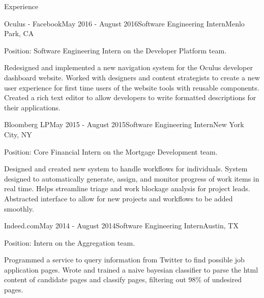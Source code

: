 \documentclass{resume} %
\begin{document}

\begin{rSection}{Experience}

  \begin{rSubsection}{Oculus - Facebook}{May 2016 - August 2016}{Software Engineering Intern}{Menlo Park, CA}
  \item Position: Software Engineering Intern on the Developer Platform team.
  \item Redesigned and implemented a new navigation system for the Oculus developer dashboard website. Worked with designers and content strategists to create a new user experience for first time users of the website tools with reusable components. Created a rich text editor to allow developers to write formatted descriptions for their applications. 
  \end{rSubsection}



  \begin{rSubsection}{Bloomberg LP}{May 2015 - August 2015}{Software Engineering Intern}{New York City, NY}
  \item Position: Core Financial Intern on the Mortgage Development team.
  \item Designed and created new system to handle workflows for individuals. System designed to automatically generate, assign, and monitor progress of work items in real time. Helps streamline triage and work blockage analysis for project leads. Abstracted interface to allow for new projects and workflows to be added smoothly. 
\end{rSubsection}


\begin{rSubsection}{Indeed.com}{May 2014 - August 2014}{Software Engineering Intern}{Austin, TX}
\item Position: Intern on the Aggregation team.
\item Programmed a service to query information from Twitter to find possible job application pages. Wrote and trained a naive bayesian classifier to parse the html content of candidate pages and classify pages, filtering out 98\% of undesired pages. 
\end{rSubsection}

\end{rSection}
\end{document}
